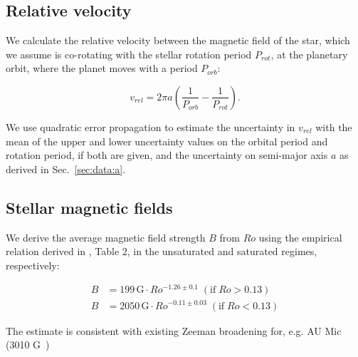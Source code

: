 \documentclass[twocolumn]{aastex631}
\begin{document}



\subsection{Relative velocity}
\label{methods:relvel}
We calculate the relative velocity between the magnetic field of the star, which we assume is co-rotating with the stellar rotation period $P_{rot}$, at the planetary orbit, where the planet moves with a period $P_{orb}$:

\begin{equation}
    v_{rel} = 2 \pi a \left(\frac{1}{P_{orb}} - \frac{1}{P_{rot}}\right).
\end{equation}

We use quadratic error propagation to estimate the uncertainty in $v_{rel}$ with the mean of the upper and lower uncertainty values on the orbital period and rotation period, if both are given, and the uncertainty on semi-major axis $a$ as derived in Sec.~\ref{sec:data:a}. 

\subsection{Stellar magnetic fields}
\label{methods:bfield}
We derive the average magnetic field strength $B$ from $Ro$ using the empirical relation derived in \cite{reiners2022magnetism},  Table 2, in the unsaturated and saturated regimes, respectively:

\begin{eqnarray}
    B &= 199\,\text{G} \cdot Ro^{-1.26\pm 0.1} \;(\text{if}\; Ro > 0.13) \\
    B &= 2050\,\text{G} \cdot Ro^{-0.11\pm 0.03} \;(\text{if}\; Ro < 0.13) 
\end{eqnarray}

The estimate is consistent with existing Zeeman broadening for, e.g. AU Mic (3010 G~\cite{reiners2022magnetism})
\end{document}
